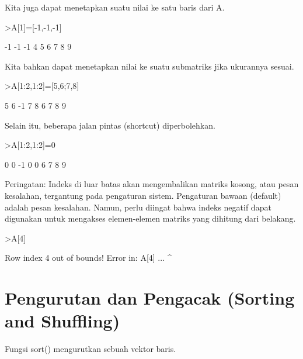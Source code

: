 \documentclass{article}
\newenvironment{eulernotebook}{\par}{\par}
\newcommand{\eulerheading}[1]{\section{#1}}
\newenvironment{eulercomment}{\par\medskip}{\par\medskip}
\begin{document}
\begin{eulernotebook}
\begin{eulercomment}
\begin{eulercomment}
\begin{eulercomment}
\begin{eulercomment}
\begin{eulercomment}
\begin{eulercomment}
\begin{eulercomment}
Kita juga dapat menetapkan suatu nilai ke satu baris dari A.
\end{eulercomment}
\begin{eulerprompt}
>A[1]=[-1,-1,-1]
\end{eulerprompt}
\begin{euleroutput}
             -1            -1            -1 
              4             5             6 
              7             8             9 
\end{euleroutput}
\begin{eulercomment}
Kita bahkan dapat menetapkan nilai ke suatu submatriks jika ukurannya
sesuai.
\end{eulercomment}
\begin{eulerprompt}
>A[1:2,1:2]=[5,6;7,8]
\end{eulerprompt}
\begin{euleroutput}
              5             6            -1 
              7             8             6 
              7             8             9 
\end{euleroutput}
\begin{eulercomment}
Selain itu, beberapa jalan pintas (shortcut) diperbolehkan.
\end{eulercomment}
\begin{eulerprompt}
>A[1:2,1:2]=0
\end{eulerprompt}
\begin{euleroutput}
              0             0            -1 
              0             0             6 
              7             8             9 
\end{euleroutput}
\begin{eulercomment}
Peringatan: Indeks di luar batas akan mengembalikan matriks kosong,
atau pesan kesalahan, tergantung pada pengaturan sistem. Pengaturan
bawaan (default) adalah pesan kesalahan. Namun, perlu diingat bahwa
indeks negatif dapat digunakan untuk mengakses elemen-elemen matriks
yang dihitung dari belakang.
\end{eulercomment}
\begin{eulerprompt}
>A[4]
\end{eulerprompt}
\begin{euleroutput}
  Row index 4 out of bounds!
  Error in:
  A[4] ...
      ^
\end{euleroutput}
\eulerheading{Pengurutan dan Pengacak (Sorting and Shuffling)}
\begin{eulercomment}
Fungsi sort() mengurutkan sebuah vektor baris.
\end{eulercomment}

\end{eulercomment}
\end{eulercomment}
\end{eulercomment}
\end{eulercomment}
\end{eulercomment}
\end{eulercomment}
\end{eulernotebook}
\end{document}

